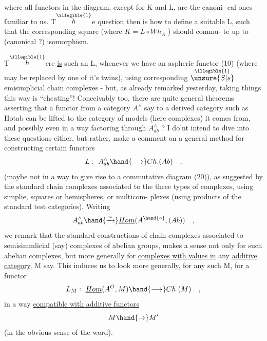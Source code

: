 
where all functors in the diagram,  except for K and L,  are the canoni-%
cal ones familiar to us.  T$\overset{\illegible{1}}{h}$e question then is how to define a suitable
L,  such that the corresponding square (where  $K = L\circ Wh_{A}$ ) should commu-%
te up to (canonical ?) isomorphism.

T$\overset{\illegible{1}}{h}$ere \uline{is} such an L,  whenever we have an  aspheric functor (10)
(where \hand{$\Delta$} may be replaced by one of it's twins),  using corresponding
$\overset{\illegible{1}}{\unsure{S|s}}$emisimplicial chain complexes  -  but, as already remarked yesterday,
taking things this way is ``cheating''!  Conceivably too,  there are quite
general theorems asserting that a functor from a category $A^{\wedge}$ say to
a derived  category such as Hotab  can be lifted to the category
of models (here  complexes)  it comes from,  and possibly even in a
way factoring through $A^{\wedge}_{ab}$ ?   I do'nt intend to dive into these questions
either,  but rather,  make a comment on a general method for constructing
certain functors
 \[ L:\ A^{\wedge}_{ab} \hand{\longrightarrow} Ch.(Ab) \quad , \]
(maybe not in a way to give rise to a commutative diagram (20)),  as
suggested by the standard chain complexes associated to the three types
of complexes,  using simplie,  squares or hemispheres,  or multicom-%
plexes (using products of the standard test categories).  Writing
\[ A^{\wedge}_{ab} \hand{\xrightarrow{\sim}} \underline{Hom}(A^{\hand{\circ}}, (Ab)) \quad , \]
we remark that the standard constructions of chain complexes associated
to semisimmlicial (say) complexes of abelian groups,  makes a sense not
only for such abelian complexes,  but more generally for \uline{complexes with
values in} any \uline{additive category},  M say.   This induces us to look
more generally,  for any such M,  for a functor
 \[ L_{M} :\ \underline{Hom}(A^{O}, M) \hand{\longrightarrow} Ch.(M) \quad , \]
in a way \uline{compatible with additive functors}
\[ M \hand{\to} M' \]
(in the obvious sense of the word).

